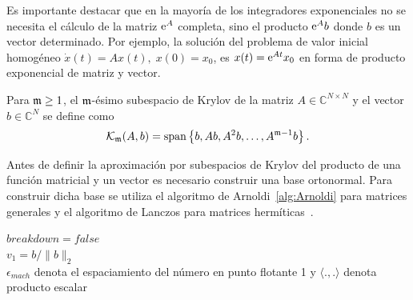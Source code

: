 Es importante destacar que en la mayoría de los integradores exponenciales
 no se necesita el cálculo de la matriz $\mathrm{e}^{A}$ completa, sino
el producto $\mathrm{e}^{A}b$ donde $b$ es un vector determinado. Por ejemplo, la solución del problema de valor inicial homogéneo $\dot{x}(t)=Ax(t),\;x(0)=x_0$, es $x(t)=\mathrm{e}^{At}x_0$ en forma de producto exponencial de matriz y vector. 
\begin{definition}
        \cite{Saad92} Para $\mathfrak{m}\geq 1$, el $\mf$-ésimo subespacio de Krylov de la matriz $A\in\mathbb{C}^{N\times N}$
    y el vector $b\in\mathbb{C}^{N}$ se define como
    \[ \mathcal{K}_{\mathfrak{m}}(A,b)=\mathrm{span}\left\{ b,Ab,A^{2}b,\ldots,A^{\mathfrak{m}-1}b \right\}. \]
\end{definition}

Antes de definir la aproximación por subespacios de Krylov del producto de una función matricial y un vector es
necesario construir una base ortonormal. Para construir dicha base se utiliza el algoritmo de
Arnoldi~\ref{alg:Arnoldi} para matrices generales y el algoritmo de 
Lanczos para matrices hermíticas~\cite{arnoldi,saad2003iterative}.
{\SetAlgoNoLine
\begin{algorithm}
    \caption{Algoritmo de Arnoldi para construir una base ortonormal $\{ v_1,\ldots,v_\mf \}$ del $\mf$-ésimo subespacio de Krylov $\mathcal{K}_\mf(A,b)=\mathrm{span} \{ b,Ab,\ldots, A^{\mf-1}b \}$}
    \label{alg:Arnoldi}

    $breakdown=false$\\
    $v_1=b/\lVert b \rVert_2$\\
\nonl $\epsilon_{mach}$ denota el espaciamiento del número en punto flotante 1 y $\langle . , .\rangle$ denota producto escalar
\end{algorithm}
}

